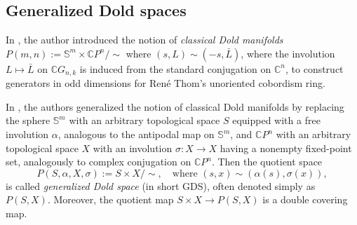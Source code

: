 \documentclass{amsart}
\begin{document}
	\subsection{Generalized Dold spaces}  \label{gen dold}
	In \cite{dold}, the author introduced the notion of \textit{classical Dold manifolds}  
	$P(m,n) := \mathbb{S}^m \times \mathbb{C}P^n / \!\! \sim$  
	where $ (s, L) \sim (-s, \bar{L}) $, where the involution $L\mapsto\bar L$ on $\mathbb CG_{n,k}$ is induced from the standard conjugation on $\mathbb C^n$, to construct generators in odd dimensions for René Thom's unoriented cobordism ring. %
	

	
	In \cite{nath-sankaran, mandal-sankaran}, the authors generalized the notion of classical Dold manifolds by replacing the sphere $ \mathbb{S}^m $ with an arbitrary topological space $ S $ equipped with a free involution $ \alpha $, analogous to the antipodal map on $ \mathbb{S}^m $, and $ \mathbb CP^n $ with an arbitrary topological space $ X $ with an involution $ \sigma: X \to X $ having a nonempty fixed-point set, analogously to complex conjugation on $\mathbb CP^n$. Then the quotient space  
	\begin{equation}\label{gen dold space}
		P(S, \alpha, X, \sigma) := S \times X / \!\! \sim, \quad \text{where } (s, x) \sim (\alpha(s), \sigma(x)), 
	\end{equation}  
	is called \textit{generalized Dold space} (in short GDS), often denoted simply as $ P(S, X) $. Moreover, the quotient map  
	$ S \times X \to P(S,X) $  
	is a double covering map. %
	
\end{document}
